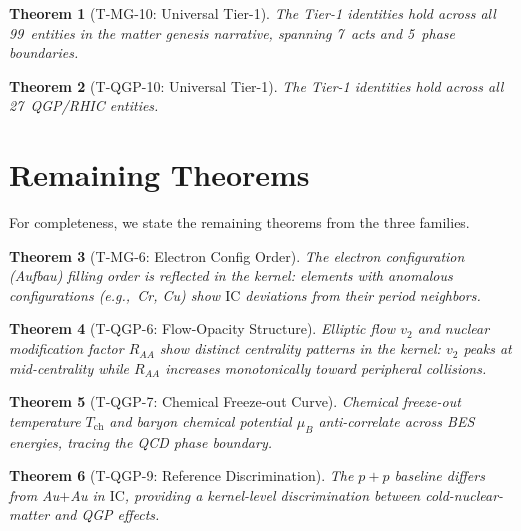 \documentclass[
  aps,
  prd,
  twocolumn,
  superscriptaddress,
  nofootinbib,
  floatfix
]{revtex4-2}
\newtheorem{theorem}{Theorem}
\newcommand{\IC}{\mathrm{IC}}
\begin{document}
\begin{theorem}[T-MG-10: Universal Tier-1]
\label{thm:mg-tier1}
The Tier-1 identities hold across all 99~entities in the
matter genesis narrative, spanning 7~acts and 5~phase
boundaries.
\end{theorem}

\begin{theorem}[T-QGP-10: Universal Tier-1]
\label{thm:qgp-tier1}
The Tier-1 identities hold across all 27~QGP/RHIC entities.
\end{theorem}

\section{Remaining Theorems}\label{sec:remaining}

For completeness, we state the remaining theorems from
the three families.

\begin{theorem}[T-MG-6: Electron Config Order]
\label{thm:econfig}
The electron configuration (Aufbau) filling order is
reflected in the kernel: elements with anomalous configurations
(e.g.,~Cr, Cu) show $\IC$ deviations from their period
neighbors.
\end{theorem}

\begin{theorem}[T-QGP-6: Flow-Opacity Structure]
\label{thm:flow}
Elliptic flow $v_2$ and nuclear modification factor $R_{AA}$
show distinct centrality patterns in the kernel: $v_2$ peaks
at mid-centrality while $R_{AA}$ increases monotonically
toward peripheral collisions.
\end{theorem}

\begin{theorem}[T-QGP-7: Chemical Freeze-out Curve]
\label{thm:freezeout}
Chemical freeze-out temperature $T_{\text{ch}}$ and baryon
chemical potential $\mu_B$ anti-correlate across BES
energies, tracing the QCD phase boundary.
\end{theorem}

\begin{theorem}[T-QGP-9: Reference Discrimination]
\label{thm:refdiscrim}
The $p{+}p$ baseline differs from Au$+$Au in $\IC$,
providing a kernel-level discrimination between
cold-nuclear-matter and QGP effects.
\end{theorem}

\end{document}
